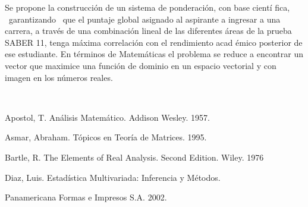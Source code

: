 \begin{titlepage}
\begin{minipage}{0.85\linewidth}
\begin{minipage}{0.85\linewidth}
\begin{resumen}
Se propone la construcci\'on de un sistema de ponderaci\'on, con base cient\'i%
fica, \ garantizando \ que el puntaje global asignado al aspirante a
ingresar a una carrera, a trav\'es de una combinaci\'on lineal de las diferentes 
\'areas de la prueba SABER 11, tenga m\'axima correlaci\'on con el rendimiento acad%
\'emico posterior de ese estudiante. En t\'erminos de Matem\'aticas el problema se
reduce a encontrar un vector que maximice una funci\'on de dominio en un
espacio vectorial y con imagen en los n\'umeros reales.
    \end{resumen}
\end{minipage}
\vspace*{5pt}\\
\footnotesize
%  
    
\end{minipage}
\vspace{5pt}
\begin{thebibliography}{99}

Apostol, T. An\'alisis Matem\'atico. Addison Wesley. 1957.

Asmar, Abraham. T\'opicos en Teor\'ia de Matrices. 1995.

Bartle, R. The Elements of Real Analysis. Second Edition. Wiley. 1976  

Diaz, Luis. Estad\'istica Multivariada: Inferencia y M\'etodos.

Panamericana Formas e Impresos S.A. 2002.
\end{thebibliography}
\end{titlepage}
